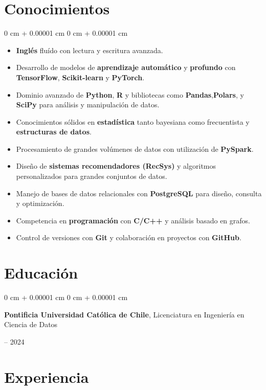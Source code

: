 \documentclass[10pt, letterpaper]{article}
\newenvironment{highlightsforbulletentries}{
    \begin{itemize}[
        topsep=0.10 cm,
        parsep=0.10 cm,
        partopsep=0pt,
        itemsep=0pt,
        leftmargin=10pt
    ]
}{
    \end{itemize}
} %
\newenvironment{onecolentry}{
    \begin{adjustwidth}{
        0 cm + 0.00001 cm
    }{
        0 cm + 0.00001 cm
    }
}{
    \end{adjustwidth}
} %
\newenvironment{twocolentry}[2][]{
    \onecolentry
    \def\secondColumn{#2}
    \setcolumnwidth{\fill, 4.5 cm}
    \begin{paracol}{2}
}{
    \switchcolumn \raggedleft \secondColumn
    \end{paracol}
    \endonecolentry
} %
\begin{document}
\section{Conocimientos}

\begin{onecolentry}
    \begin{highlightsforbulletentries}

\begin{itemize}
    \item \textbf{Inglés} fluído  con lectura y escritura avanzada.
    \item Desarrollo de modelos de \textbf{aprendizaje automático} y \textbf{profundo} con \textbf{TensorFlow}, \textbf{Scikit-learn} y \textbf{PyTorch}.
    \item Dominio avanzado de \textbf{Python}, \textbf{R} y bibliotecas como \textbf{Pandas},\textbf{Polars},  y \textbf{SciPy} para análisis y manipulación de datos.
    \item Conocimientos sólidos en \textbf{estadística} tanto bayesiana como frecuentista y \textbf{estructuras de datos}.
    \item Procesamiento de grandes volúmenes de datos con utilización de \textbf{PySpark}.
    \item Diseño de \textbf{sistemas recomendadores (RecSys)} y algoritmos personalizados para grandes conjuntos de datos.
    \item Manejo de bases de datos relacionales con \textbf{PostgreSQL} para diseño, consulta y optimización.
    \item Competencia en \textbf{programación} con \textbf{C/C++} y análisis basado en grafos.
    \item Control de versiones con \textbf{Git} y colaboración en proyectos con \textbf{GitHub}.
\end{itemize}
\end{highlightsforbulletentries}
\end{onecolentry}

\section{Educación}

\begin{twocolentry}{
    2021 – 2024
}
    \textbf{Pontificia Universidad Católica de Chile}, Licenciatura en Ingeniería en Ciencia de Datos
\end{twocolentry}

\section{Experiencia}
\end{document}
